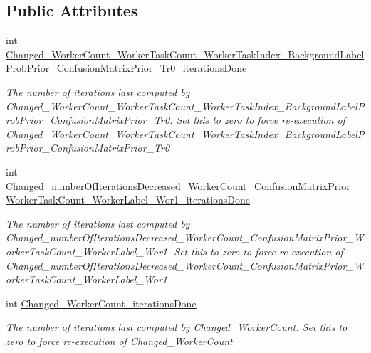 \subsection*{Public Attributes}
\begin{DoxyCompactItemize}
\item 
int \hyperlink{class_microsoft_research_1_1_infer_1_1_models_1_1_user_1_1_model___e_p_a68cc9b27a065511a79d56f87983fc56d}{Changed\+\_\+\+Worker\+Count\+\_\+\+Worker\+Task\+Count\+\_\+\+Worker\+Task\+Index\+\_\+\+Background\+Label\+Prob\+Prior\+\_\+\+Confusion\+Matrix\+Prior\+\_\+\+Tr0\+\_\+iterations\+Done}
\begin{DoxyCompactList}\small\item\em The number of iterations last computed by Changed\+\_\+\+Worker\+Count\+\_\+\+Worker\+Task\+Count\+\_\+\+Worker\+Task\+Index\+\_\+\+Background\+Label\+Prob\+Prior\+\_\+\+Confusion\+Matrix\+Prior\+\_\+\+Tr0. Set this to zero to force re-\/execution of Changed\+\_\+\+Worker\+Count\+\_\+\+Worker\+Task\+Count\+\_\+\+Worker\+Task\+Index\+\_\+\+Background\+Label\+Prob\+Prior\+\_\+\+Confusion\+Matrix\+Prior\+\_\+\+Tr0\end{DoxyCompactList}\item 
int \hyperlink{class_microsoft_research_1_1_infer_1_1_models_1_1_user_1_1_model___e_p_a6ba5341acb834c6b1b7afc6f339bc210}{Changed\+\_\+number\+Of\+Iterations\+Decreased\+\_\+\+Worker\+Count\+\_\+\+Confusion\+Matrix\+Prior\+\_\+\+Worker\+Task\+Count\+\_\+\+Worker\+Label\+\_\+\+Wor1\+\_\+iterations\+Done}
\begin{DoxyCompactList}\small\item\em The number of iterations last computed by Changed\+\_\+number\+Of\+Iterations\+Decreased\+\_\+\+Worker\+Count\+\_\+\+Confusion\+Matrix\+Prior\+\_\+\+Worker\+Task\+Count\+\_\+\+Worker\+Label\+\_\+\+Wor1. Set this to zero to force re-\/execution of Changed\+\_\+number\+Of\+Iterations\+Decreased\+\_\+\+Worker\+Count\+\_\+\+Confusion\+Matrix\+Prior\+\_\+\+Worker\+Task\+Count\+\_\+\+Worker\+Label\+\_\+\+Wor1\end{DoxyCompactList}\item 
int \hyperlink{class_microsoft_research_1_1_infer_1_1_models_1_1_user_1_1_model___e_p_a6dba112878fc8583d1a25218cb7da60d}{Changed\+\_\+\+Worker\+Count\+\_\+iterations\+Done}
\begin{DoxyCompactList}\small\item\em The number of iterations last computed by Changed\+\_\+\+Worker\+Count. Set this to zero to force re-\/execution of Changed\+\_\+\+Worker\+Count\end{DoxyCompactList}\item 

\end{DoxyCompactItemize}
